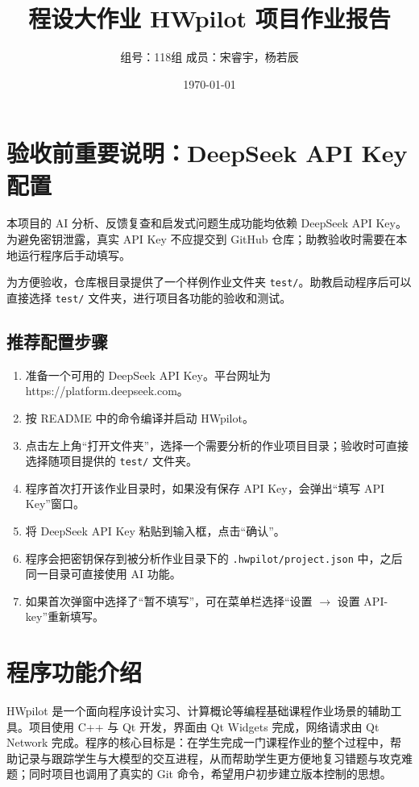 \documentclass[UTF8,a4paper,11pt,fontset=fandol]{ctexart}
\title{\textbf{程设大作业 HWpilot 项目作业报告}}
\author{组号：118组 \quad 成员：宋睿宇，杨若辰}
\date{\today}
\begin{document}
\sloppy

\maketitle

\section*{验收前重要说明：DeepSeek API Key 配置}

本项目的 AI 分析、反馈复查和启发式问题生成功能均依赖 DeepSeek API Key。为避免密钥泄露，真实 API Key 不应提交到 GitHub 仓库；助教验收时需要在本地运行程序后手动填写。

为方便验收，仓库根目录提供了一个样例作业文件夹 \texttt{test/}。助教启动程序后可以直接选择 \texttt{test/} 文件夹，进行项目各功能的验收和测试。

\subsection*{推荐配置步骤}

\begin{enumerate}
    \item 准备一个可用的 DeepSeek API Key。平台网址为https://platform.deepseek.com。 
    \item 按 README 中的命令编译并启动 HWpilot。
    \item 点击左上角“打开文件夹”，选择一个需要分析的作业项目目录；验收时可直接选择随项目提供的 \texttt{test/} 文件夹。
    \item 程序首次打开该作业目录时，如果没有保存 API Key，会弹出“填写 API Key”窗口。
    \item 将 DeepSeek API Key 粘贴到输入框，点击“确认”。
    \item 程序会把密钥保存到被分析作业目录下的 \texttt{.hwpilot/project.json} 中，之后同一目录可直接使用 AI 功能。
    \item 如果首次弹窗中选择了“暂不填写”，可在菜单栏选择“设置 $\rightarrow$ 设置 API-key”重新填写。
\end{enumerate}

\newpage
\tableofcontents
\newpage

\section{程序功能介绍}

HWpilot 是一个面向程序设计实习、计算概论等编程基础课程作业场景的辅助工具。项目使用 C++ 与 Qt 开发，界面由 Qt Widgets 完成，网络请求由 Qt Network 完成。程序的核心目标是：在学生完成一门课程作业的整个过程中，帮助记录与跟踪学生与大模型的交互进程，从而帮助学生更方便地复习错题与攻克难题；同时项目也调用了真实的 Git 命令，希望用户初步建立版本控制的思想。
\end{document}
